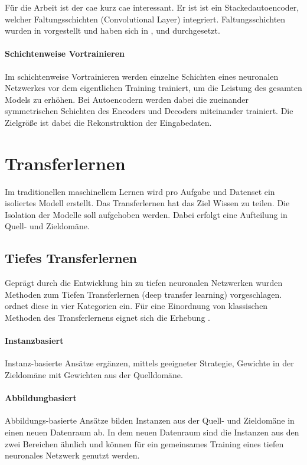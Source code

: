 	Für die Arbeit ist der \acl{cae} \cite{Masci.2011} kurz \ac{cae} interessant. Er ist ist ein Stackedautoencoder, welcher Faltungsschichten (Convolutional Layer)  integriert. Faltungsschichten wurden in \cite{LeCun.1999} vorgestellt und haben sich in \cite{Krizhevsky.2012}, \cite{ChristianSzegedy.2014}  und \cite{LeCun.2015} durchgesetzt. 
	
	\paragraph{Schichtenweise Vortrainieren} Im schichtenweise Vortrainieren \cite{Bengio.2007}  werden einzelne Schichten eines neuronalen Netzwerkes vor dem eigentlichen Training trainiert, um die Leistung des gesamten Models zu erhöhen. Bei Autoencodern werden dabei die zueinander symmetrischen Schichten des Encoders und Decoders miteinander trainiert. Die Zielgröße ist dabei die Rekonstruktion der Eingabedaten.    

	\section{ Transferlernen}
	\label{sec:Transferlernen}
	Im traditionellen maschinellem Lernen wird pro Aufgabe und Datenset ein isoliertes Modell erstellt. Das Transferlernen hat das Ziel Wissen zu teilen. Die Isolation der Modelle soll aufgehoben werden. Dabei erfolgt eine Aufteilung in Quell- und Zieldomäne.
	
		\subsection{Tiefes Transferlernen}
		Geprägt durch die Entwicklung hin zu tiefen neuronalen Netzwerken wurden Methoden zum Tiefen Transferlernen (deep transfer learning) vorgeschlagen. \cite{Tan.2018} ordnet diese in vier Kategorien ein. Für eine Einordnung von klassischen Methoden des Transferlernens eignet sich die Erhebung \cite{FuzhenZhuang.2019}.
		     
		\paragraph{Instanzbasiert} Instanz-basierte Ansätze ergänzen, mittels geeigneter Strategie, Gewichte in der Zieldomäne mit Gewichten aus der Quelldomäne.
		\paragraph{Abbildungbasiert} Abbildungs-basierte Ansätze bilden Instanzen aus der Quell- und Zieldomäne in einen neuen Datenraum ab. In dem neuen Datenraum sind die Instanzen aus den zwei Bereichen ähnlich und können für ein gemeinsames Training eines tiefen neuronales Netzwerk genutzt werden. 

